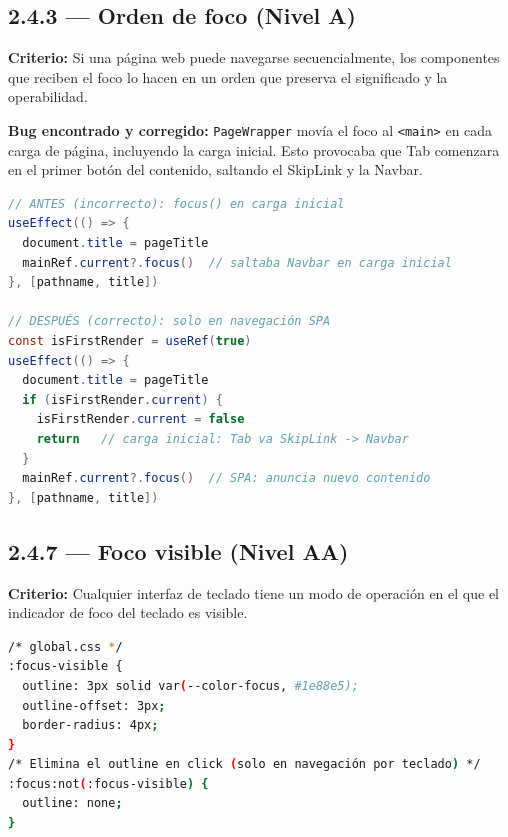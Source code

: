 \documentclass[12pt, a4paper]{article}
\begin{document}
\subsection{2.4.3 --- Orden de foco (Nivel A)}

\textbf{Criterio:} Si una página web puede navegarse secuencialmente, los componentes que reciben el foco lo hacen en un orden que preserva el significado y la operabilidad.

\textbf{Bug encontrado y corregido:} \texttt{PageWrapper} movía el foco al \texttt{<main>} en cada carga de página, incluyendo la carga inicial. Esto provocaba que Tab comenzara en el primer botón del contenido, saltando el SkipLink y la Navbar.

\begin{evidbox}
\begin{lstlisting}[language=Java]
// ANTES (incorrecto): focus() en carga inicial
useEffect(() => {
  document.title = pageTitle
  mainRef.current?.focus()  // saltaba Navbar en carga inicial
}, [pathname, title])

// DESPUÉS (correcto): solo en navegación SPA
const isFirstRender = useRef(true)
useEffect(() => {
  document.title = pageTitle
  if (isFirstRender.current) {
    isFirstRender.current = false
    return   // carga inicial: Tab va SkipLink -> Navbar
  }
  mainRef.current?.focus()  // SPA: anuncia nuevo contenido
}, [pathname, title])
\end{lstlisting}
\end{evidbox}

\subsection{2.4.7 --- Foco visible (Nivel AA)}

\textbf{Criterio:} Cualquier interfaz de teclado tiene un modo de operación en el que el indicador de foco del teclado es visible.

\begin{evidbox}
\begin{lstlisting}[language=bash]
/* global.css */
:focus-visible {
  outline: 3px solid var(--color-focus, #1e88e5);
  outline-offset: 3px;
  border-radius: 4px;
}
/* Elimina el outline en click (solo en navegación por teclado) */
:focus:not(:focus-visible) {
  outline: none;
}
\end{lstlisting}
\end{evidbox}
\end{document}
